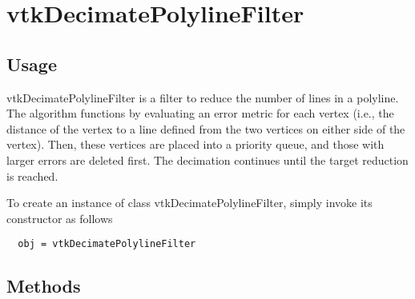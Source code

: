 \section{vtkDecimatePolylineFilter}

\subsection{Usage}

 vtkDecimatePolylineFilter is a filter to reduce the number of lines in a
 polyline. The algorithm functions by evaluating an error metric for each
 vertex (i.e., the distance of the vertex to a line defined from the two
 vertices on either side of the vertex). Then, these vertices are placed
 into a priority queue, and those with larger errors are deleted first.
 The decimation continues until the target reduction is reached.


To create an instance of class vtkDecimatePolylineFilter, simply
invoke its constructor as follows
\begin{verbatim}
  obj = vtkDecimatePolylineFilter
\end{verbatim}
\subsection{Methods}

